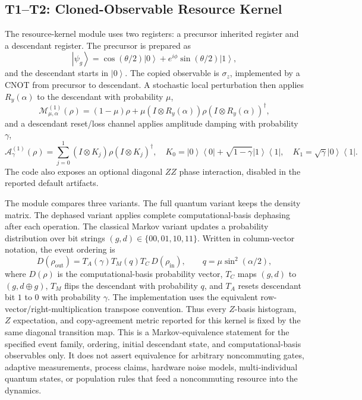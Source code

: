 \documentclass[11pt]{article}
\newcommand{\ket}[1]{\left|#1\right\rangle}
\newcommand{\bra}[1]{\left\langle#1\right|}
\newcommand{\sz}{\sigma_z}
\begin{document}
\subsection{T1--T2: Cloned-Observable Resource Kernel}

The resource-kernel module uses two registers: a precursor inherited register and a descendant register. The precursor is prepared as
\begin{equation}
\ket{\psi_g}=\cos(\theta/2)\ket{0}+e^{i\phi}\sin(\theta/2)\ket{1},
\end{equation}
and the descendant starts in $\ket{0}$. The copied observable is $\sz$, implemented by a CNOT from precursor to descendant. A stochastic local perturbation then applies $R_y(\alpha)$ to the descendant with probability $\mu$,
\begin{equation}
\mathcal{M}_{\mu,\alpha}^{(1)}(\rho)=(1-\mu)\rho+\mu (I\otimes R_y(\alpha))\rho(I\otimes R_y(\alpha))^\dagger,
\end{equation}
and a descendant reset/loss channel applies amplitude damping with probability $\gamma$,
\begin{equation}
\mathcal{A}_{\gamma}^{(1)}(\rho)=\sum_{j=0}^1 (I\otimes K_j)\rho(I\otimes K_j)^\dagger,\quad
K_0=\ket{0}\bra{0}+\sqrt{1-\gamma}\ket{1}\bra{1},\quad
K_1=\sqrt{\gamma}\ket{0}\bra{1}.
\end{equation}
The code also exposes an optional diagonal $ZZ$ phase interaction, disabled in the reported default artifacts.

The module compares three variants. The full quantum variant keeps the density matrix. The dephased variant applies complete computational-basis dephasing after each operation. The classical Markov variant updates a probability distribution over bit strings $(g,d)\in\{00,01,10,11\}$. Written in column-vector notation, the event ordering is
\begin{equation}
D(\rho_{\mathrm{out}})=T_A(\gamma)T_M(q)T_C\,D(\rho_{\mathrm{in}}),\qquad q=\mu\sin^2(\alpha/2),
\end{equation}
where $D(\rho)$ is the computational-basis probability vector, $T_C$ maps $(g,d)$ to $(g,d\oplus g)$, $T_M$ flips the descendant with probability $q$, and $T_A$ resets descendant bit $1$ to $0$ with probability $\gamma$. The implementation uses the equivalent row-vector/right-multiplication transpose convention. Thus every $Z$-basis histogram, $Z$ expectation, and copy-agreement metric reported for this kernel is fixed by the same diagonal transition map. This is a Markov-equivalence statement for the specified event family, ordering, initial descendant state, and computational-basis observables only. It does not assert equivalence for arbitrary noncommuting gates, adaptive measurements, process claims, hardware noise models, multi-individual quantum states, or population rules that feed a noncommuting resource into the dynamics.
\end{document}
